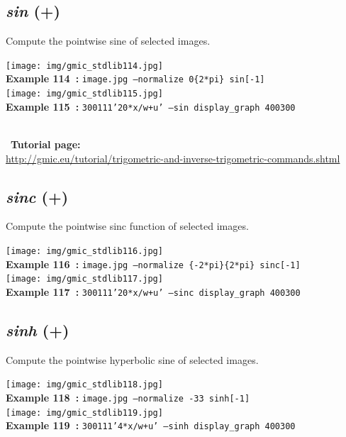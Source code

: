 \documentclass[a4paper,10.5pt,twoside]{book}
\def\comma{\discretionary{,}{}{,}}
\begin{document}
\subsection{\emph{sin} (+)}\vspace*{-0.7em}
Compute the pointwise sine of selected images.
\begin{center}\texttt{[image: img/gmic\_stdlib114.jpg]}\\
{\footnotesize \textbf{Example 114~:} \texttt{image.jpg --normalize 0{\comma}\{2*pi\} sin[-1]}}
\\\texttt{[image: img/gmic\_stdlib115.jpg]}\\
{\footnotesize \textbf{Example 115~:} \texttt{300{\comma}1{\comma}1{\comma}1{\comma}'20*x/w+u' --sin display\_graph 400{\comma}300}}
\end{center}
~\\
~\textbf{Tutorial page: }\\\url{http://gmic.eu/tutorial/trigometric-and-inverse-trigometric-commands.shtml}


\subsection{\emph{sinc} (+)}\vspace*{-0.7em}
Compute the pointwise sinc function of selected images.
\begin{center}\texttt{[image: img/gmic\_stdlib116.jpg]}\\
{\footnotesize \textbf{Example 116~:} \texttt{image.jpg --normalize \{-2*pi\}{\comma}\{2*pi\} sinc[-1]}}
\\\texttt{[image: img/gmic\_stdlib117.jpg]}\\
{\footnotesize \textbf{Example 117~:} \texttt{300{\comma}1{\comma}1{\comma}1{\comma}'20*x/w+u' --sinc display\_graph 400{\comma}300}}
\end{center}

\subsection{\emph{sinh} (+)}\vspace*{-0.7em}
Compute the pointwise hyperbolic sine of selected images.
\begin{center}\texttt{[image: img/gmic\_stdlib118.jpg]}\\
{\footnotesize \textbf{Example 118~:} \texttt{image.jpg --normalize -3{\comma}3 sinh[-1]}}
\\\texttt{[image: img/gmic\_stdlib119.jpg]}\\
{\footnotesize \textbf{Example 119~:} \texttt{300{\comma}1{\comma}1{\comma}1{\comma}'4*x/w+u' --sinh display\_graph 400{\comma}300}}
\end{center}
\end{document}
